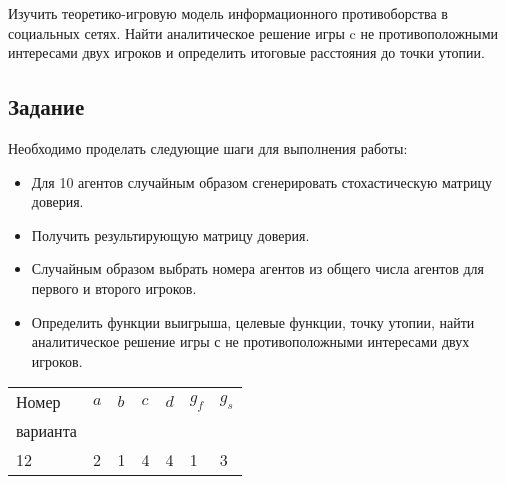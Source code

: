 
Изучить теоретико-игровую модель информационного противоборства в
социальных сетях. Найти аналитическое решение игры c не
противоположными интересами двух игроков и определить итоговые
расстояния до точки утопии.

\subsection*{Задание}

Необходимо проделать следующие шаги для выполнения работы:

\begin{itemize}
  \item Для 10 агентов случайным образом сгенерировать стохастическую матрицу доверия.
  \item Получить результирующую матрицу доверия.
  \item Случайным образом выбрать номера агентов из общего числа агентов
        для первого и второго игроков.
  \item Определить функции выигрыша, целевые функции, точку утопии, найти
        аналитическое решение игры с не противоположными интересами двух
        игроков.
\end{itemize}

\begin{table}
\centering
\begin{tabularx}{\textwidth}{|X|X|X|X|X|X|X|}\hline
Номер & $a$ & $b$ & $c$ & $d$ & $g_f$ & $g_s$ \\
варианта &  &  &  &  &  &  \\ \hline
12 & 2 & 1 & 4 & 4 & 1 & 3 \\ \hline
\end{tabularx}
\end{table}
